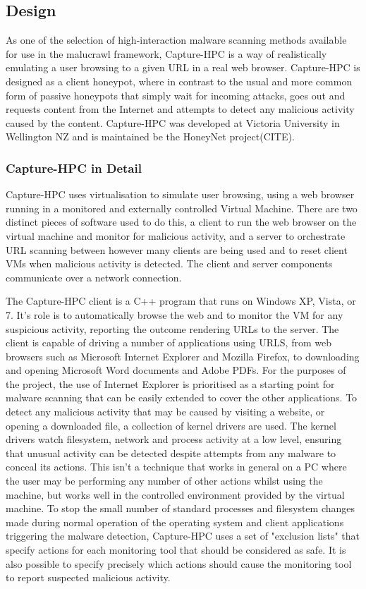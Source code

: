 \subsection{Design}

As one of the selection of high-interaction malware scanning
methods available for use in the malucrawl framework,
Capture-HPC\cite{capture-hpc} is a way of
realistically emulating a user browsing to a given URL in a real web browser.
Capture-HPC is designed as a client honeypot, where in contrast to the usual and
more common form of passive honeypots that simply wait for incoming attacks,
goes out and requests content from the Internet and attempts to detect any
malicious activity caused by the content. Capture-HPC was developed at Victoria
University in Wellington NZ and is maintained be the HoneyNet project(CITE).

\subsubsection{Capture-HPC in Detail}

Capture-HPC uses virtualisation to simulate user browsing, using a web browser
running in a monitored and externally controlled Virtual Machine. There are two
distinct pieces of software used to do this, a client to run the web browser on
the virtual machine and monitor for malicious activity, and a server to
orchestrate URL scanning between however many clients are being used and to
reset client VMs when malicious activity is detected. The client and server
components communicate over a network connection.

The Capture-HPC client is a C++ program that runs on Windows XP, Vista, or 7.
It's role is to automatically browse the web and to monitor the VM for any
suspicious activity, reporting the outcome rendering URLs to the server. The
client is capable of driving a number of applications using URLS, from web
browsers such as Microsoft Internet Explorer and Mozilla Firefox, to downloading and opening
Microsoft Word documents and Adobe PDFs. For the purposes of the project, the
use of Internet Explorer is prioritised as a starting point for malware scanning
that can be easily extended to cover the other applications. To detect any
malicious activity that may be caused by visiting a website, or opening a
downloaded file, a collection of kernel drivers are used. The kernel drivers
watch filesystem, network and process activity at a low level, ensuring that
unusual activity can be detected despite attempts from any malware to conceal
its actions. This isn't a technique that works in general on a PC where the user
may be performing any number of other actions whilst using the machine, but
works well in the controlled environment provided by the virtual machine. To
stop the small number of standard processes and filesystem changes made during
normal operation of the operating system and client applications triggering the
malware detection, Capture-HPC uses a set of "exclusion lists" that specify
actions for each monitoring tool that should be considered as safe. It is also
possible to specify precisely which actions should cause the monitoring tool to
report suspected malicious activity.

